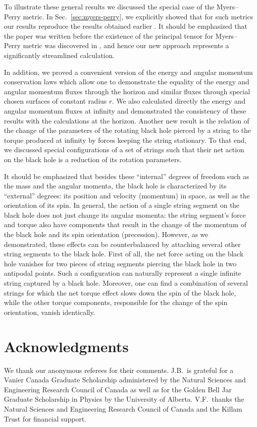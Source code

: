 \documentclass[superscriptaddress,twocolumn,showpacs,
preprintnumbers,amsmath,amssymb,nofootinbib,
longbibliography,aps,prd,10pt]{revtex4-1}
\begin{document}
To illustrate these general results we discussed the special case of the Myers--Perry metric. In Sec.~\ref{sec:myers-perry}, we explicitly showed that for such metrics our results reproduce the results obtained earlier \cite{Frolov:2004qw}. It should be emphasized that the paper \cite{Frolov:2004qw} was written before the existence of the principal tensor for Myers--Perry metric was discovered in \cite{Frolov:2007nt}, and hence our new approach represents a significantly streamlined calculation.

In addition, we proved a convenient version of the energy and angular momentum conservation laws which allow one to demonstrate the equality of the energy and angular momentum fluxes through the horizon and similar fluxes through special chosen surfaces of constant radius $r$. We also calculated directly the energy and angular momentum fluxes at infinity and demonstrated the consistency of these results with the calculations at the horizon. Another new result is the relation of the change of the parameters of the rotating black hole pierced by a string to the torque produced at infinity by forces keeping the string stationary. To that end, we discussed special configurations of a set of strings such that their net action on the black hole is a reduction of its rotation parameters.

It should be emphasized that besides these ``internal'' degrees of freedom such as the mass and the angular momenta, the black hole is characterized by its ``external'' degrees: its position and velocity (momentum) in space, as well as the orientation of its spin. In general, the action of a single string segment on the black hole does not just change its angular momenta: the string segment's force and torque also have components that result in the change of the momentum of the black hole and its spin orientation (precession). However, as we demonstrated, these effects can be counterbalanced by attaching several other string segments to the black hole. First of all, the net force acting on the black hole vanishes for two pieces of string segments piercing the black hole in two antipodal points. Such a configuration can naturally represent a single infinite string captured by a black hole. Moreover, one can find a combination of several strings for which the net torque effect slows down the spin of the black hole, while the other torque components, responsible for the change of the spin orientation, vanish identically.

\section*{Acknowledgments}
We thank our anonymous referees for their comments. J.B.\ is grateful for a Vanier Canada Graduate Scholarship administered by the Natural Sciences and Engineering Research Council of Canada as well as for the Golden Bell Jar Graduate Scholarship in Physics by the University of Alberta.
V.F.\ thanks the Natural Sciences and Engineering Research Council of Canada and the Killam Trust for financial support.

{}
\end{document}
